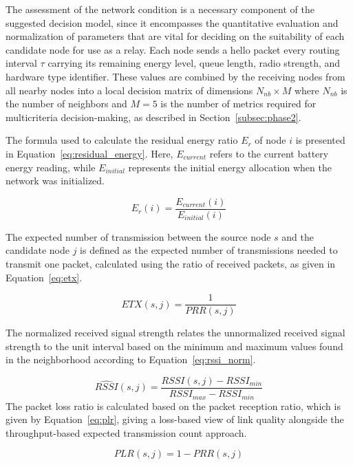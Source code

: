 \documentclass[a4paper,fleqn]{cas-dc}
\numberwithin{equation}{section}
\begin{document}
The assessment of the network condition is a necessary component of the suggested
decision model, since it encompasses the quantitative evaluation
and normalization of parameters that are vital for deciding on
the suitability of each candidate node for use as a relay.
Each node sends a hello packet every routing interval $\tau$
carrying its remaining energy level, queue length, radio strength,
and hardware type identifier. These values are combined by the
receiving nodes from all nearby nodes into a local decision matrix of dimensions $N_{nb}
\times M$ where $N_{nb}$ is the number of neighbors and $M=5$ is the
number of metrics required for multicriteria decision-making, as
described in Section~\ref{subsec:phase2}.

The formula used to calculate the residual energy ratio $E_r$ of node $i$ is presented in Equation~\ref{eq:residual_energy}. Here, $E_{current}$ refers to the current battery energy reading, while $E_{initial}$ represents the initial energy allocation when the network was initialized.

\begin{equation}
\label{eq:residual_energy}
E_r(i) = \frac{E_{current}(i)}{E_{initial}(i)}
\end{equation}

The expected number of transmission between the source node $s$
and the candidate node $j$ is defined as the expected number of
transmissions needed to transmit one packet, calculated using the
ratio of received packets, as given in Equation~\ref{eq:etx}.

\begin{equation}
\label{eq:etx}
ETX(s, j) = \frac{1}{PRR(s, j)}
\end{equation}

The normalized received signal strength relates the unnormalized received
signal strength to the unit interval based on the minimum and maximum
values found in the neighborhood according to Equation~\ref{eq:rssi_norm}.

\begin{equation}
\label{eq:rssi_norm}
\widehat{RSSI}(s, j) =
\frac{RSSI(s,j) - RSSI_{min}}{RSSI_{max} - RSSI_{min}}
\end{equation}
The packet loss ratio is calculated based on the packet reception
ratio, which is given by Equation~\ref{eq:plr}, giving a loss-based
view of link quality alongside the throughput-based expected
transmission count approach.

\begin{equation}
\label{eq:plr}
PLR(s, j) = 1 - PRR(s, j)
\end{equation}
\end{document}
